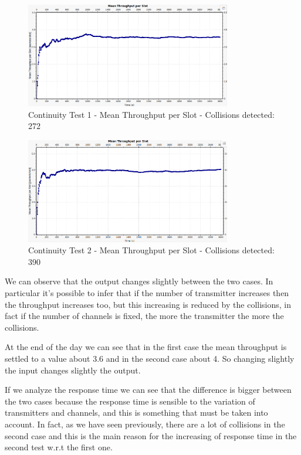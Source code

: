 \begin{figure}[H]
	\centering
	\includegraphics[width=0.8\textwidth]{img/continuityTest1a.png}
	\caption{Continuity Test 1 - Mean Throughput per Slot - Collisions detected: 272}
	\label {img: continuityTest1a}
\end{figure}

\begin{figure}[H]
	\centering
	\includegraphics[width=0.8\textwidth]{img/continuityTest1b.png}
	\caption{Continuity Test 2 - Mean Throughput per Slot - Collisions detected: 390}
	\label {img: continuityTest1b}
\end{figure}

\noindent We can observe that the output changes slightly between the two cases. In particular it's possible to infer that if the number of transmitter increases then the throughput increases too, but this increasing is reduced by the collisions, in fact if the number of channels is fixed, the more the transmitter the more the collisions.

\noindent At the end of the day we can see that in the first case the mean throughput is settled to a value about 3.6 and in the second case about 4. So changing slightly the input changes slightly the output.

\noindent If we analyze the response time we can see that the difference is bigger between the two cases because the response time is sensible to the variation of transmitters and channels, and this is something that must be taken into account. In fact, as we have seen previously, there are a lot of collisions in the second case and this is the main reason for the increasing of response time in the second test w.r.t the first one.



